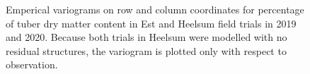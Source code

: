 \begin{figure}[H]

{\centering {}

}

\caption{Emperical variograms on row and column coordinates for
percentage of tuber dry matter content in Est and Heelsum field trials
in 2019 and 2020. Because both trials in Heelsum were modelled with no
residual structures, the variogram is plotted only with respect to
observation.}

\end{figure}%


